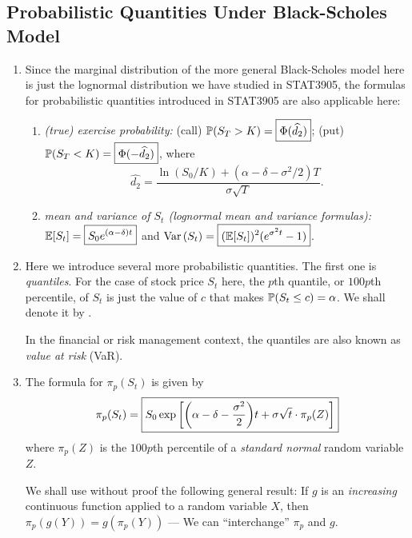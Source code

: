 \subsection{Probabilistic Quantities Under Black-Scholes Model}
\begin{enumerate}
\item Since the marginal distribution of the more general Black-Scholes model
here is just the lognormal distribution we have studied in STAT3905, the
formulas for probabilistic quantities introduced in STAT3905 are also
applicable here:
\begin{enumerate}
\item\label{it:bs-ex-prob} \emph{(true) exercise probability:} (call)
\(\mathbb{P}\qty(S_T>K)=\boxed{\Phi(\widehat{d_2})}\); (put)
\(\mathbb{P}\qty(S_T<K)=\boxed{\Phi(-\widehat{d_2})}\), where
\[
\widehat{d_2}=\frac{\ln(S_0/K)+(\alpha-\delta-\sigma^2/2)T}{\sigma\sqrt{T}}.
\]
\item \label{it:bs-mean-var-stock-price} \emph{mean and variance of \(S_t\)
(lognormal mean and variance formulas):}
\(\mathbb{E}\qty[S_t]=\boxed{S_0e^{(\alpha-\delta)t}}\) and
\(\operatorname{Var}\qty(S_t)=\boxed{(\mathbb{E}\qty[S_t])^{2}(e^{\sigma^{2} t}-1)}\).
\end{enumerate}

\item Here we introduce several more probabilistic quantities. The first one is
\emph{quantiles}. For the case of stock price \(S_t\) here, the \(p\)th
quantile, or \(100p\)th percentile, of \(S_t\) is just the value of \(c\) that
makes \(\mathbb{P}\qty(S_t\le c)=\alpha\). We shall denote it by
.

\begin{note}
In the financial or risk management context, the quantiles are also known as
\emph{value at risk} (VaR).
\end{note}

\item \label{it:bs-stock-price-quantile-fmla} The formula for \(\pi_{p}(S_t)\)
is given by
\[
\pi_{p}(S_t)=\boxed{S_0\exp\qty[\qty(\alpha-\delta-\frac{\sigma^2}{2})t + \sigma\sqrt{t}\cdot \pi_{p}(Z)]}
\]
where \(\pi_{p}(Z)\) is the \(100p\)th percentile of a \emph{standard normal}
random variable \(Z\).

\begin{pf}
We shall use without proof the following general result: If \(g\) is an
\emph{increasing} continuous function applied to a random variable \(X\), then
\(\pi_{p}(g(Y))=g(\pi_{p}(Y))\) --- We can ``interchange'' \(\pi_{p}\) and
\(g\).


\end{pf}
\end{enumerate}
